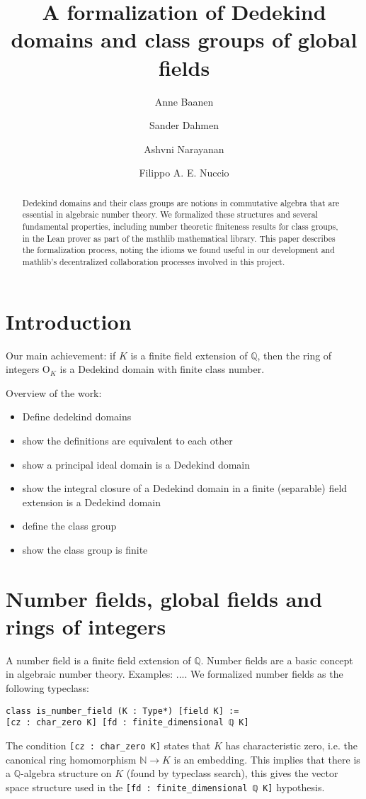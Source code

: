 \documentclass[a4paper,USenglish,cleveref, autoref, thm-restate]{lipics-v2021}
\title{A formalization of Dedekind domains and class groups of global fields}
\author{Anne Baanen}{Vrije Universiteit Amsterdam, Netherlands \and \url{https://cs.vu.nl/~tbn305}}{t.baanen@vu.nl}{https://orcid.org/0000-0001-8497-3683}{Received funding from the NWO under the Vidi program (project No. 016.Vidi.189.037, Lean Forward)}
\author{Sander Dahmen}{Vrije Universiteit Amsterdam, Netherlands \and \url{https://few.vu.nl/~sdn249/}}{s.r.dahmen@vu.nl}{orcID?}{funding?}
\author{Ashvni Narayanan}{affiliation? \and website?}{email}{orcID?}{funding?}
\author{Filippo A. E. Nuccio}{affiliation? \and website?}{email}{orcID?}{funding?}
\newcommand{\lean}[1]{\texttt{#1}\xspace} %
\newcommand{\OK}{\mathrm{O}_K}
\newcommand{\N}{\mathbb{N}}
\newcommand{\Q}{\mathbb{Q}}
\begin{document}
\maketitle

\begin{abstract}
Dedekind domains and their class groups are notions in commutative algebra that are essential in algebraic number theory.
We formalized these structures and several fundamental properties, including number theoretic finiteness results for class groups, in the Lean prover as part of the mathlib mathematical library.
This paper describes the formalization process,
noting the idioms we found useful in our development
and mathlib's decentralized collaboration processes involved in this project.
\end{abstract}

\section{Introduction}

Our main achievement: if $K$ is a finite field extension of $\Q$, then the ring of integers $\OK$ is a Dedekind domain with finite class number.

Overview of the work:
\begin{itemize}
 \item Define dedekind domains
 \item show the definitions are equivalent to each other
 \item show a principal ideal domain is a Dedekind domain
 \item show the integral closure of a Dedekind domain in a finite (separable) field extension is a Dedekind domain
 \item define the class group
 \item show the class group is finite
\end{itemize}

\section{Number fields, global fields and rings of integers}

A number field is a finite field extension of $\Q$.
Number fields are a basic concept in algebraic number theory. Examples: ....
We formalized number fields as the following typeclass:
\begin{lstlisting}
class is_number_field (K : Type*) [field K] :=
[cz : char_zero K] [fd : finite_dimensional ℚ K]
\end{lstlisting}
The condition \lean{[cz : char\_zero K]} states that $K$ has characteristic zero, i.e. the canonical ring homomorphism $\N \to K$ is an embedding.
This implies that there is a $\Q$-algebra structure on $K$ (found by typeclass search), this gives the vector space structure used in the \lean{[fd : finite\_dimensional ℚ K]} hypothesis.
\end{document}
